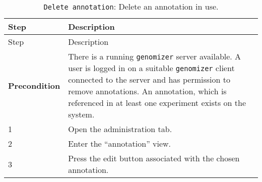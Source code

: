 \begin{longtable}[c]{@{}ll@{}}
\caption{\texttt{Delete\ annotation}: Delete an annotation in
use.}\tabularnewline
\toprule
\begin{minipage}[b]{0.31\columnwidth}\raggedright\strut
Step
\strut\end{minipage} &
\begin{minipage}[b]{0.63\columnwidth}\raggedright\strut
Description
\strut\end{minipage}\tabularnewline
\midrule
\endfirsthead
\toprule
\begin{minipage}[b]{0.31\columnwidth}\raggedright\strut
Step
\strut\end{minipage} &
\begin{minipage}[b]{0.63\columnwidth}\raggedright\strut
Description
\strut\end{minipage}\tabularnewline
\midrule
\endhead
\begin{minipage}[t]{0.31\columnwidth}\raggedright\strut
\textbf{Precondition}
\strut\end{minipage} &
\begin{minipage}[t]{0.63\columnwidth}\raggedright\strut
There is a running \texttt{genomizer} server available. A user is logged
in on a suitable \texttt{genomizer} client connected to the server and
has permission to remove annotations. An annotation, which is referenced
in at least one experiment exists on the system.
\strut\end{minipage}\tabularnewline
\begin{minipage}[t]{0.31\columnwidth}\raggedright\strut
1
\strut\end{minipage} &
\begin{minipage}[t]{0.63\columnwidth}\raggedright\strut
Open the administration tab.
\strut\end{minipage}\tabularnewline
\begin{minipage}[t]{0.31\columnwidth}\raggedright\strut
2
\strut\end{minipage} &
\begin{minipage}[t]{0.63\columnwidth}\raggedright\strut
Enter the ``annotation'' view.
\strut\end{minipage}\tabularnewline
\begin{minipage}[t]{0.31\columnwidth}\raggedright\strut
3
\strut\end{minipage} &
\begin{minipage}[t]{0.63\columnwidth}\raggedright\strut
Press the edit button associated with the chosen annotation.
\strut\end{minipage}\tabularnewline

\end{longtable}

